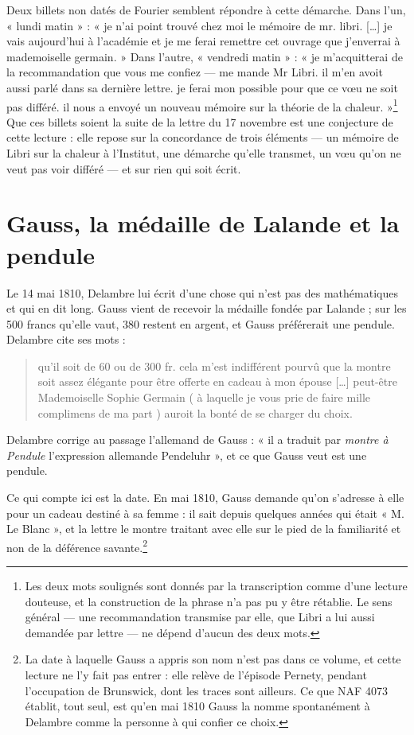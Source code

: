 \documentclass[11pt,a4paper]{article}
\begin{document}
Deux billets non datés de Fourier semblent répondre à cette démarche. Dans
l'un, « lundi matin » : « je n'ai point trouvé chez moi le mémoire de mr.
libri. […] je vais aujourd'hui à l'académie et je me ferai remettre cet ouvrage
que j'enverrai à mademoiselle germain. » Dans l'autre, « vendredi matin » : « je
m'acquitterai de la recommandation que vous me confiez —
me mande Mr Libri. il m'en avoit aussi parlé dans sa dernière
lettre. je ferai mon possible pour que ce vœu ne soit pas différé. il nous a
envoyé un nouveau mémoire sur la théorie de la chaleur. »\footnote{Les deux
mots soulignés sont donnés par la transcription comme d'une lecture douteuse,
et la construction de la phrase n'a pas pu y être rétablie. Le sens général ---
une recommandation transmise par elle, que Libri a lui aussi demandée par
lettre --- ne dépend d'aucun des deux mots.} Que ces billets soient la suite de
la lettre du 17 novembre est une conjecture de cette lecture : elle repose sur
la concordance de trois éléments --- un mémoire de Libri sur la chaleur à
l'Institut, une démarche qu'elle transmet, un vœu qu'on ne veut pas voir
différé --- et sur rien qui soit écrit.

\section*{Gauss, la médaille de Lalande et la pendule}

Le 14 mai 1810, Delambre lui écrit d'une chose qui n'est pas des mathématiques
et qui en dit long. Gauss vient de recevoir la médaille fondée par Lalande ;
sur les 500 francs qu'elle vaut, 380 restent en argent, et Gauss préférerait
une pendule. Delambre cite ses mots :
\begin{quote}
qu'il soit de 60 ou de 300 fr. cela m'est indifférent pourvû que la montre soit
assez élégante pour être offerte en cadeau à mon épouse […] peut-être
Mademoiselle Sophie Germain ( à laquelle je vous prie de faire mille complimens
de ma part ) auroit la bonté de se charger du choix.
\end{quote}
Delambre corrige au passage l'allemand de Gauss : « il a traduit par
\emph{montre à Pendule} l'expression allemande Pendeluhr », et ce que Gauss
veut est une pendule.

Ce qui compte ici est la date. En mai 1810, Gauss demande qu'on s'adresse à
elle pour un cadeau destiné à sa femme : il sait depuis quelques années qui
était « M. Le Blanc », et la lettre le montre traitant avec elle sur le pied de
la familiarité et non de la déférence savante.\footnote{La date à laquelle
Gauss a appris son nom n'est pas dans ce volume, et cette lecture ne l'y fait
pas entrer : elle relève de l'épisode Pernety, pendant l'occupation de
Brunswick, dont les traces sont ailleurs. Ce que NAF 4073 établit, tout seul,
est qu'en mai 1810 Gauss la nomme spontanément à Delambre comme la personne à
qui confier ce choix.}
\end{document}
